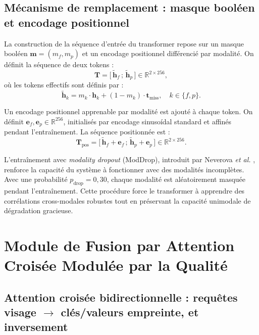 \documentclass[12pt,a4paper]{report}
\begin{document}
\subsection{M\'{e}canisme de remplacement : masque bool\'{e}en et encodage positionnel}

La construction de la s\'{e}quence d'entr\'{e}e du transformer repose sur un masque bool\'{e}en $\mathbf{m} = (m_f, m_p)$ et un encodage positionnel diff\'{e}renci\'{e} par modalit\'{e}. On d\'{e}finit la s\'{e}quence de deux tokens :
\begin{equation}
\label{eq:sequence-tokens}
\mathbf{T} = \bigl[ \, \tilde{\mathbf{h}}_f \,; \, \tilde{\mathbf{h}}_p \, \bigr] \in \mathbb{R}^{2 \times 256},
\end{equation}
o\`{u} les tokens effectifs sont d\'{e}finis par :
\begin{equation}
\tilde{\mathbf{h}}_k = m_k \cdot \mathbf{h}_k + (1 - m_k) \cdot \mathbf{t}_{\text{miss}}, \quad k \in \{f, p\}.
\end{equation}

Un encodage positionnel apprenable par modalit\'{e} est ajout\'{e} \`{a} chaque token. On d\'{e}finit $\mathbf{e}_f, \mathbf{e}_p \in \mathbb{R}^{256}$, initialis\'{e}s par encodage sinuso\'{i}dal standard et affin\'{e}s pendant l'entra\^{i}nement. La s\'{e}quence positionn\'{e}e est :
\begin{equation}
\mathbf{T}_{\text{pos}} = \bigl[ \, \tilde{\mathbf{h}}_f + \mathbf{e}_f \,; \, \tilde{\mathbf{h}}_p + \mathbf{e}_p \, \bigr] \in \mathbb{R}^{2 \times 256}.
\end{equation}

L'entra\^{i}nement avec \emph{modality dropout} (ModDrop), introduit par Neverova \emph{et al.} \cite{neverova2016moddrop}, renforce la capacit\'{e} du syst\`{e}me \`{a} fonctionner avec des modalit\'{e}s incompl\`{e}tes. Avec une probabilit\'{e} $p_{\text{drop}} = 0{,}30$, chaque modalit\'{e} est al\'{e}atoirement masqu\'{e}e pendant l'entra\^{i}nement. Cette proc\'{e}dure force le transformer \`{a} apprendre des corr\'{e}lations cross-modales robustes tout en pr\'{e}servant la capacit\'{e} unimodale de d\'{e}gradation gracieuse.

\section{Module de Fusion par Attention Crois\'{e}e Modul\'{e}e par la Qualit\'{e}}
\label{sec:attention}

\subsection{Attention crois\'{e}e bidirectionnelle : requ\^{e}tes visage $\rightarrow$ cl\'{e}s/valeurs empreinte, et inversement}
\end{document}
